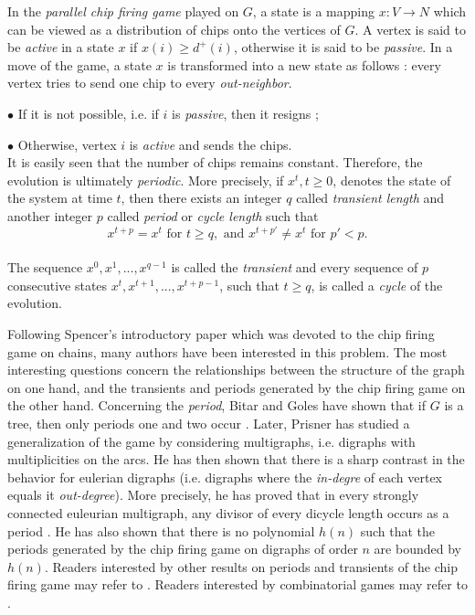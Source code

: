 \documentclass{article}
\begin{document}
In the {\em parallel chip firing game} played on $G$, a state is a mapping
$x: V \rightarrow N$ which can be viewed as a distribution of chips onto the
vertices of $G$. A vertex is said to be {\em active} in a state $x$ if
$x(i)\geq d^+(i)$, otherwise it is said to be {\em passive}. In a move of the
game, a state $x$ is transformed into a new state as follows : every vertex
tries to send one chip to every {\em out-neighbor}.

\hspace{2mm}$\bullet$ If it is not possible, i.e. if $i$ is {\em passive}, then it
resigns ;

\hspace{2mm}$\bullet$ Otherwise, vertex $i$ is {\em active} and sends the chips.\\
It is easily seen that the number of chips remains constant. Therefore, the
evolution is ultimately {\em periodic}. More precisely, if $x^t,t\geq 0$,
denotes the state of the system at time $t$, then there exists an integer $q$
called {\em transient length} and another integer $p$ called {\em period}
or  {\em cycle length } such that \\
\begin{equation}  \label{eqn:period}
x^{t+p}=x^t \mbox{ for } t\geq q, \mbox{ and } x^{t+p'}\neq x^t \mbox{ for }
p'<p.
\end{equation}\\
The sequence $x^0,x^1,...,x^{q-1}$ is called the {\em transient} and every
sequence of $p$ consecutive states $x^t,x^{t+1},...,x^{t+p-1}$, such that
$t\geq q$, is called a {\em cycle} of the evolution.

Following Spencer's introductory paper \cite{SPE:86} which was devoted to the
chip firing game on chains, many authors have been interested in this
problem. The most interesting questions concern the relationships between the
structure of the graph on one hand, and the transients and periods generated
by the chip firing game on the other hand. Concerning the {\em period}, Bitar and
Goles have shown that if $G$ is a tree, then only periods one and two occur
\cite{BIT:92}. Later, Prisner has studied a generalization of the game by
considering multigraphs, i.e. digraphs with multiplicities on the arcs. He
has then shown that there is a sharp contrast in the behavior for eulerian
digraphs (i.e. digraphs where the {\em in-degre} of each vertex equals it {\em
  out-degree}). More precisely, he has proved that in every strongly connected
euleurian multigraph, any divisor of every dicycle length occurs as a period
\cite{PRI:94}. He has also shown that there is no polynomial $h(n)$ such that
the periods generated by the chip firing game on digraphs of order $n$ are
bounded by $h(n)$. Readers interested by other results on periods and
transients of the chip firing game may refer to \cite{TAR:88,AND:89,BIT:89,BJO:91,ERI:91,GOL:93}.
 Readers interested by combinatorial games may refer to \cite{Gol:02, GM:02, Gol:04, Sjo:05, Fra:09}.
\end{document}
